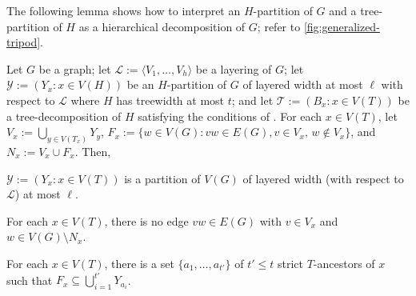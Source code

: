 \documentclass{patmorin}
\newcommand{\notex}[2]{}
\newcommand{\ylabel}[1]{\label{y:#1}}
\newcommand{\yref}[1]{(Y\ref{y:#1})}
\renewcommand{\le}{\leqslant}
\begin{document}

\notex{DW}{Is some sort of converse to \cref{generalized-tripod}  also true? \cref{generalized-tripod}  shows that if a graph $G$ has a layered partition with all the nice properties, then $G$ has this generalised tripod partition. Isn't also true that if $G$ has a generalised tripod partition, then $G$ has a layered partition with all the nice properties. The proof is basically in \citep{dujmovic.joret.ea:planar}, right?}
\notex{PM}{Yes, if by generalized tripod partition you mean $T$ and $\mathcal{Y}=(Y_x:x\in V(T))$ that satisify \yref{thickness}, \yref{separator}, and \yref{ancestor-edge}.  From \yref{separator} and \yref{ancestor-edge} you can construct a width-$t$ $T$-decomposition of $H=G/\mathcal{Y}$.  By \yref{thickness}, $\mathcal{Y}$, has layered width at most $\ell$.}

The following lemma shows how to interpret an $H$-partition of $G$ and a tree-partition of $H$ as a hierarchical decomposition of $G$; refer to \cref{fig:generalized-tripod}.
  
\begin{lem}\label{generalized-tripod}
  Let $G$ be a graph; let $\mathcal{L}:=\langle V_1,\ldots,V_h\rangle$ be a layering of $G$; let $\mathcal{Y}:=(Y_x: x\in V(H))$ be an $H$-partition of $G$ of layered width at most $\ell$ with respect to $\mathcal{L}$ where $H$ has treewidth at most $t$; and let $\mathcal{T}:=(B_x:x\in V(T))$ be a tree-decomposition of $H$ satisfying the conditions of .  For each $x\in V(T)$, let $V_x := \bigcup_{y\in V(T_x)} Y_y$, $F_x:=\{w\in V(G): vw\in E(G), v\in V_x,\, w\not\in V_x\}$, and $N_x:=V_x\cup F_x$.  Then, 
  \begin{compactenum}[(Y1)]
    \item\ylabel{thickness} $\mathcal{Y}:=(Y_x: x\in V(T))$ is a partition of $V(G)$ of layered width (with respect to $\mathcal{L}$) at most $\ell$.
    \item\ylabel{separator} For each $x\in V(T)$, there is no edge $vw\in E(G)$ with $v\in V_x$ and $w\in V(G)\setminus N_x$. 
    \item\ylabel{ancestor-edge} For each $x\in V(T)$, there is a set $\{a_1,\ldots,a_{t'}\}$ of $t'\le t$ strict $T$-ancestors of $x$ such that $F_x \subseteq \bigcup_{i=1}^{t'} Y_{a_i}$.
  \end{compactenum}
\end{lem}
\end{document}
